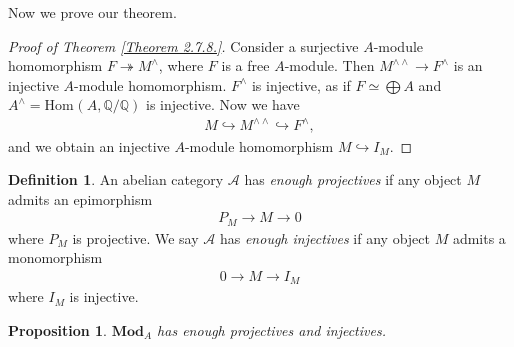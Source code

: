 \documentclass[12pt]{article}
\theoremstyle{plain}
\newtheorem{proposition}[theorem]{Proposition}
\theoremstyle{remark}
\theoremstyle{definition}
\newtheorem{definition}[theorem]{Definition}
\newcommand{\Q}{\mathbb{Q}}
\newcommand{\Hom}[3]{\mathrm{Hom}_{#3}(#1,#2)}
\begin{document}
Now we prove our theorem.

\begin{proof}[Proof of Theorem \ref{Theorem 2.7.8.}]
    Consider a surjective $A$-module homomorphism $F\twoheadrightarrow M^\wedge$, where $F$ is a free $A$-module. Then $M^{\wedge\wedge}\rightarrow F^\wedge$ is an injective $A$-module homomorphism. $F^\wedge$ is injective, as if $F\simeq \bigoplus A$ and $A^\wedge=\Hom{A}{\Q/\Q}{}$ is injective. Now we have
    \begin{align*}
        M\hookrightarrow M^{\wedge\wedge} \hookrightarrow F^\wedge,
    \end{align*}
    and we obtain an injective $A$-module homomorphism $M\hookrightarrow I_M$.
\end{proof}

\begin{definition}
    An abelian category $\mathcal{A}$ has \emph{enough projectives} if any object $M$ admits an epimorphism
    \begin{align*}
        P_M\rightarrow M\rightarrow 0
    \end{align*}
    where $P_M$ is projective. We say $\mathcal{A}$ has \emph{enough injectives} if any object $M$ admits a monomorphism
    \begin{align*}
        0\rightarrow M\rightarrow I_M
    \end{align*}
    where $I_M$ is injective.
\end{definition}

\begin{proposition}
    $\mathbf{Mod}_A$ has enough projectives and injectives.
\end{proposition}
\end{document}

